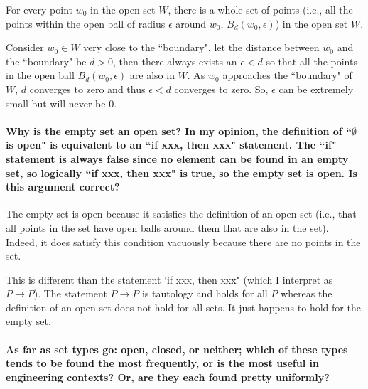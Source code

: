 \documentclass[10pt,english]{article}
\begin{document}
For every point $w_0$ in the open set $W$, there is a whole set of points (i.e., all the points within the open ball of radius $\epsilon$ around $w_0$, $B_d(w_0, \epsilon)$) in the open set $W$.

Consider $w_0 \in W$ very close to the ``boundary", let the distance between $w_0$ and the ``boundary" be $d > 0$, then there always exists an $\epsilon < d$ so that all the points in the open ball $B_d(w_0, \epsilon)$ are also in $W$. As $w_0$ approaches the ``boundary" of $W$, $d$ converges to zero and thus $\epsilon < d$ converges to zero. So, $\epsilon$ can be extremely small but will never be 0.

%


\paragraph{Why is the empty set an open set? In my opinion, the definition of ``$\emptyset$ is open" is equivalent to an ``if xxx, then xxx" statement. The ``if" statement is always false since no element can be found in an empty set, so logically ``if xxx, then xxx" is true, so the empty set is open. Is this argument correct?}

The empty set is open because it satisfies the definition of an open set (i.e., that all points in the set have open balls around them that are also in the set).
Indeed, it does satisfy this condition vacuously because there are no points in the set.

This is different than the statement `if xxx, then xxx" (which I interpret as $P\to P$).
The statement $P\to P$ is tautology and holds for all $P$ whereas the definition of an open set does not hold for all sets.
It just happens to hold for the empty set.


\paragraph{As far as set types go: open, closed, or neither; which of these types tends to be found the most frequently, or is the most useful in engineering contexts? Or, are they each found pretty uniformly?}
\end{document}
